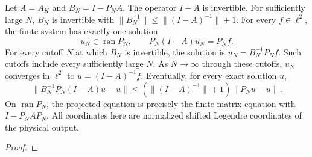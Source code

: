 \begin{theorem}
\label{thm:volterra-finite-section-solves}
\leanok
Let $A=A_K$ and $B_N=I-P_NA$. The operator $I-A$ is invertible.
For sufficiently large $N$, $B_N$ is invertible with
$\|B_N^{-1}\|\le\|(I-A)^{-1}\|+1$.
For every $f\in\ell^2$, the finite system has exactly one solution
\[
 u_N\in\operatorname{ran}P_N,\qquad P_N(I-A)u_N=P_Nf.
\]
For every cutoff $N$ at which $B_N$ is invertible, the solution is $u_N=B_N^{-1}P_Nf$. Such cutoffs include every sufficiently large $N$. As $N\to\infty$ through these cutoffs, $u_N$ converges in $\ell^2$ to
$u=(I-A)^{-1}f$. Eventually, for every exact solution $u$,
\[
 \|B_N^{-1}P_N(I-A)u-u\|
 \le (\|(I-A)^{-1}\|+1)\|P_Nu-u\|.
\]
On $\operatorname{ran}P_N$, the projected equation is precisely the finite
matrix equation with $I-P_NAP_N$. All coordinates here are normalized shifted
Legendre coordinates of the physical output.
\end{theorem}
\begin{proof}
\leanok
\end{proof}

